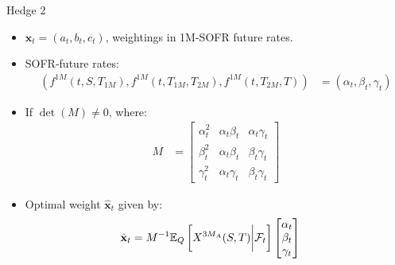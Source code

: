 \documentclass[UKenglish]{beamer}
\newcommand{\E}{\mathbb{E}}  %
\newcommand{\F}{\mathcal{F}} %
\begin{document}
\begin{frame}{Hedge 2}

\begin{itemize}
    \item $\mathbf{x}_{t} = (a_{t}, b_{t}, c_{t})$, weightings in 1M-SOFR future rates.  
    \item SOFR-future rates:
    \begin{align*}
    \left(
    f^{1M}(t,S,T_{1M}), f^{1M}(t,T_{1M}, T_{2M}), f^{1M}(t,T_{2M}, T)
    \right)
    &= (\alpha_{t}, \beta_{t}, \gamma_{t})
    \end{align*}
    \item If $\det(M)\neq 0$, where:
    \begin{align*}
    M &= 
    \begin{bmatrix}
    \alpha_{t}^{2} & \alpha_{t}\beta_{t} &  \alpha_{t}\gamma_{t} \\ 
    \beta_{t}^{2} & \alpha_{t}\beta_{t} &   \beta_{t}\gamma_{t} \\ 
    \gamma_{t}^{2} & \alpha_{t}\gamma_{t} &     \beta_{t}\gamma_{t}
    \end{bmatrix}
    \end{align*}
    \item Optimal weight $\hat{\mathbf{x}}_{t}$ given by: 
    \begin{align*}
    \hat{\mathbf{x}}_{t} &= M^{-1}\E_{Q}\left[
    X^{3M_{A}}(S,T)\bigg{|}\F_{t}
    \right]
    \begin{bmatrix}
    \alpha_{t} \\ 
    \beta_{t} \\ 
    \gamma_{t} 
    \end{bmatrix}
    \end{align*}
\end{itemize}

\end{frame}
\end{document}
